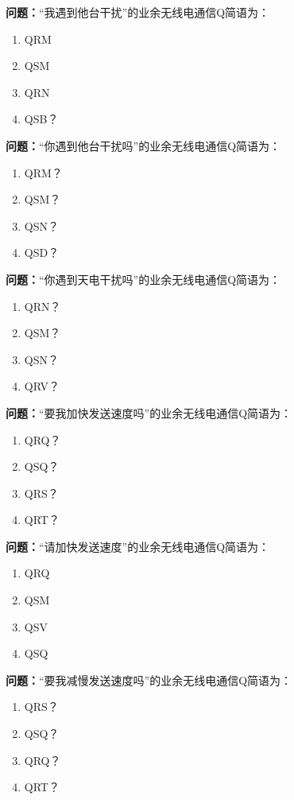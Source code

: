 \noindent\textbf{问题：}“我遇到他台干扰”的业余无线电通信Q简语为：
\begin{enumerate}[label=\Alph*), leftmargin=3em]
\item QRM
\item QSM
\item QRN
\item QSB？
\end{enumerate}

\bigskip


\noindent\textbf{问题：}“你遇到他台干扰吗”的业余无线电通信Q简语为：
\begin{enumerate}[label=\Alph*), leftmargin=3em]
\item QRM？
\item QSM？
\item QSN？
\item QSD？
\end{enumerate}

\bigskip


\noindent\textbf{问题：}“你遇到天电干扰吗”的业余无线电通信Q简语为：
\begin{enumerate}[label=\Alph*), leftmargin=3em]
\item QRN？
\item QSM？
\item QSN？
\item QRV？
\end{enumerate}

\bigskip


\noindent\textbf{问题：}“要我加快发送速度吗”的业余无线电通信Q简语为：
\begin{enumerate}[label=\Alph*), leftmargin=3em]
\item QRQ？
\item QSQ？
\item QRS？
\item QRT？
\end{enumerate}

\bigskip


\noindent\textbf{问题：}“请加快发送速度”的业余无线电通信Q简语为：
\begin{enumerate}[label=\Alph*), leftmargin=3em]
\item QRQ
\item QSM
\item QSV
\item QSQ
\end{enumerate}

\bigskip


\noindent\textbf{问题：}“要我减慢发送速度吗”的业余无线电通信Q简语为：
\begin{enumerate}[label=\Alph*), leftmargin=3em]
\item QRS？
\item QSQ？
\item QRQ？
\item QRT？
\end{enumerate}

